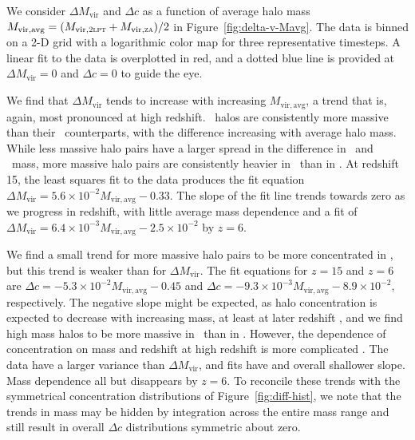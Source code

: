 We consider $\Delta M_{\mathrm{vir}}$ and $\Delta c$ as a function of average halo mass $M_{\mathrm{vir,avg}} = (M_{\mathrm{vir},\textsc{2lpt}} + M_{\mathrm{vir},\textsc{za}}) / 2$ in Figure~\ref{fig:delta-v-Mavg}.  The data is binned on a 2-D grid with a logarithmic color map for three representative timesteps.  A linear fit to the data is overplotted in red, and a dotted blue line is provided at $\Delta M_{\mathrm{vir}} = 0$ and $\Delta c = 0$ to guide the eye.

We find that $\Delta M_{\mathrm{vir}}$ tends to increase with increasing $M_{\mathrm{vir,avg}}$, a trend that is, again, most pronounced at high redshift.  \lpt\ halos are consistently more massive than their \za\ counterparts, with the difference increasing with average halo mass.  While less massive halo pairs have a larger spread in the difference in \lpt\ and \za\ mass, more massive halo pairs are consistently heavier in \lpt\ than in \za.  At redshift 15, the least squares fit to the data produces the fit equation $\Delta M_{\mathrm{vir}} = 5.6 \times 10^{-2} M_{\mathrm{vir,avg}} - 0.33$.   The slope of the fit line trends towards zero as we progress in redshift, with little average mass dependence and a fit of $\Delta M_{\mathrm{vir}} = 6.4 \times 10^{-3} M_{\mathrm{vir,avg}} - 2.5 \times 10^{-2}$ by $z = 6$.

We find a small trend for more massive halo pairs to be more concentrated in \za, but this trend is weaker than for $\Delta M_{\mathrm{vir}}$.  The fit equations for $z = 15$ and $z = 6$ are $\Delta c = -5.3 \times 10^{-2} M_{\mathrm{vir,avg}} - 0.45$ and $\Delta c = -9.3 \times 10^{-3} M_{\mathrm{vir,avg}} - 8.9 \times 10^{-2}$, respectively.  The negative slope might be expected, as halo concentration is expected to decrease with increasing mass, at least at later redshift \citep{2007MNRAS.381.1450N}, and we find high mass halos to be more massive in \lpt\ than in \za.  However, the dependence of concentration on mass and redshift at high redshift is more complicated \citep{2011ApJ...740..102K, 2012MNRAS.423.3018P}.  The data have a larger variance than $\Delta M_{\mathrm{vir}}$, and fits have and overall shallower slope.  Mass dependence all but disappears by $z = 6$.  To reconcile these trends with the symmetrical concentration distributions of Figure~\ref{fig:diff-hist}, we note that the trends in mass may be hidden by integration across the entire mass range and still result in overall $\Delta c$ distributions symmetric about zero.





